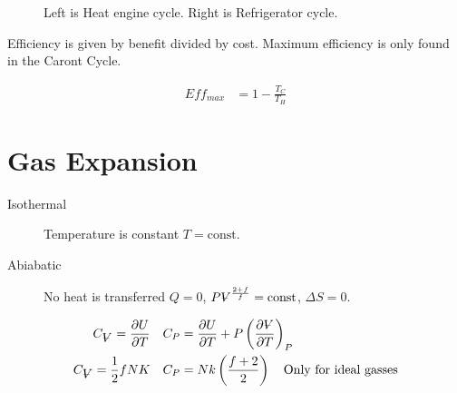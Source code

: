 \documentclass[10pt]{article}
\newcommand{\V}{{\ooalign{\hfil$V$\hfil\cr\kern0.08em--\hfil\cr}}}
\begin{document}
\begin{figure}[htpb]
  \centering
  \begin{minipage}{.4\linewidth}
  \end{minipage}
  \begin{minipage}{.4\linewidth}
  \end{minipage}
  \caption{Left is Heat engine cycle. Right is Refrigerator cycle.}
\end{figure}

Efficiency is given by benefit divided by cost. Maximum efficiency is only
found in the Caront Cycle.

\begin{align}
  Eff_{max}&=1-\frac{T_C}{T_H}
\end{align}

\section{Gas Expansion}%
\label{sec:gas_expansion}

\begin{description}
  \item[Isothermal] Temperature is constant $T=\text{const}$.
  \item[Abiabatic] No heat is transferred $Q=0$,
    $P\V^{\frac{2+f}{f}}=\text{const}$, $\Delta S =0$.
\end{description}

\begin{align}
  C_\V=\frac{\partial U}{\partial T}&\quad C_P=\frac{\partial U}{\partial
    T}+P\left(\frac{\partial \V}{\partial T}\right)_P\\
  C_\V=\frac{1}{2}fNK&\quad C_P=Nk\left(\frac{f+2}{2}\right)\quad\text{Only for
  ideal gasses}
\end{align}
\end{document}
